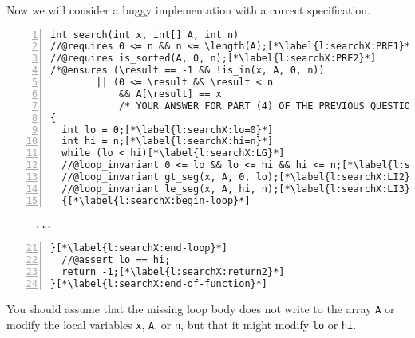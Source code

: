 \clearpage
{}
\label{q:search2}

Now we will consider a buggy implementation with a correct specification.

\begin{lstlisting}[numbers=left,belowskip=0pt]
int search(int x, int[] A, int n)
//@requires 0 <= n && n <= \length(A);[*\label{l:searchX:PRE1}*]
//@requires is_sorted(A, 0, n);[*\label{l:searchX:PRE2}*]
/*@ensures (\result == -1 && !is_in(x, A, 0, n))
        || (0 <= \result && \result < n
            && A[\result] == x
            /* YOUR ANSWER FOR PART (4) OF THE PREVIOUS QUESTION*/); @*/
{
  int lo = 0;[*\label{l:searchX:lo=0}*]
  int hi = n;[*\label{l:searchX:hi=n}*]
  while (lo < hi)[*\label{l:searchX:LG}*]
  //@loop_invariant 0 <= lo && lo <= hi && hi <= n;[*\label{l:searchX:LI1}*]
  //@loop_invariant gt_seg(x, A, 0, lo);[*\label{l:searchX:LI2}*]
  //@loop_invariant le_seg(x, A, hi, n);[*\label{l:searchX:LI3}*]
  {[*\label{l:searchX:begin-loop}*]
\end{lstlisting}
\lstinline'     ...'
\begin{lstlisting}[numbers=left,firstnumber=21]
  }[*\label{l:searchX:end-loop}*]
  //@assert lo == hi;
  return -1;[*\label{l:searchX:return2}*]
}[*\label{l:searchX:end-of-function}*]
\end{lstlisting}
% 
% 

You should assume that the missing loop body does not write to the
array \lstinline'A' or modify the local variables \lstinline'x',
\lstinline'A', or \lstinline'n', but that it might modify
\lstinline'lo' or \lstinline'hi'.

